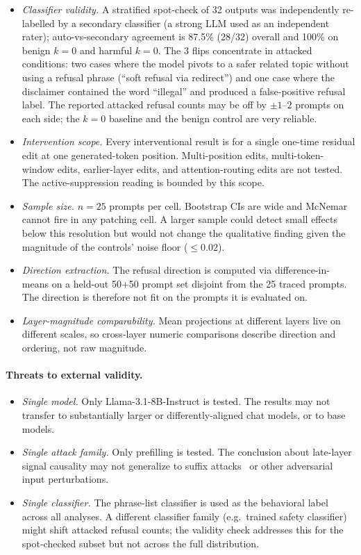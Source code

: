 \documentclass{article}
\begin{document}
\begin{itemize}
\item \emph{Classifier validity.} A stratified spot-check of 32 outputs
  was independently re-labelled by a secondary classifier (a strong LLM
  used as an independent rater); auto-vs-secondary agreement is 87.5\%
  (28/32) overall and 100\% on benign $k=0$ and harmful $k=0$. The 3
  flips concentrate in attacked conditions: two cases where the model
  pivots to a safer related topic without using a refusal phrase
  (``soft refusal via redirect'') and one case where the disclaimer
  contained the word ``illegal'' and produced a false-positive refusal
  label. The reported attacked refusal counts may be off by
  $\pm 1$--$2$ prompts on each side; the $k=0$ baseline and the benign
  control are very reliable.
\item \emph{Intervention scope.} Every interventional result is for a
  single one-time residual edit at one generated-token position.
  Multi-position edits, multi-token-window edits, earlier-layer edits,
  and attention-routing edits are not tested. The active-suppression
  reading is bounded by this scope.
\item \emph{Sample size.} $n=25$ prompts per cell. Bootstrap CIs are
  wide and McNemar cannot fire in any patching cell. A larger sample
  could detect small effects below this resolution but would not change
  the qualitative finding given the magnitude of the controls' noise
  floor ($\le 0.02$).
\item \emph{Direction extraction.} The refusal direction is computed
  via difference-in-means on a held-out 50+50 prompt set disjoint from
  the 25 traced prompts. The direction is therefore not fit on the
  prompts it is evaluated on.
\item \emph{Layer-magnitude comparability.} Mean projections at
  different layers live on different scales, so cross-layer numeric
  comparisons describe direction and ordering, not raw magnitude.
\end{itemize}

\paragraph{Threats to external validity.}

\begin{itemize}
\item \emph{Single model.} Only Llama-3.1-8B-Instruct is tested. The
  results may not transfer to substantially larger or differently-aligned
  chat models, or to base models.
\item \emph{Single attack family.} Only prefilling is tested. The
  conclusion about late-layer signal causality may not generalize to
  suffix attacks~\cite{zou2023advbench} or other adversarial input
  perturbations.
\item \emph{Single classifier.} The phrase-list classifier is used as
  the behavioral label across all analyses. A different classifier
  family (e.g.\ trained safety classifier) might shift attacked
  refusal counts; the validity check addresses this for the spot-checked
  subset but not across the full distribution.
\end{itemize}
\end{document}

